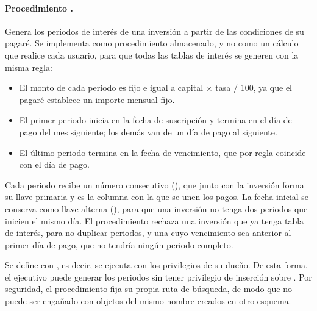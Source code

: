 \paragraph{Procedimiento .} Genera los periodos de interés de una inversión a partir de las condiciones de su pagaré. Se implementa como procedimiento almacenado, y no como un cálculo que realice cada usuario, para que todas las tablas de interés se generen con la misma regla:

\begin{itemize}[leftmargin=*]
	\item El monto de cada periodo es fijo e igual a capital $\times$ tasa / 100, ya que el pagaré establece un importe mensual fijo.
	\item El primer periodo inicia en la fecha de suscripción y termina en el día de pago del mes siguiente; los demás van de un día de pago al siguiente.
	\item El último periodo termina en la fecha de vencimiento, que por regla coincide con el día de pago.
\end{itemize}

Cada periodo recibe un número consecutivo (), que junto con la inversión forma su llave primaria y es la columna con la que se unen los pagos. La fecha inicial se conserva como llave alterna (), para que una inversión no tenga dos periodos que inicien el mismo día. El procedimiento rechaza una inversión que ya tenga tabla de interés, para no duplicar periodos, y una cuyo vencimiento sea anterior al primer día de pago, que no tendría ningún periodo completo.

Se define con , es decir, se ejecuta con los privilegios de su dueño. De esta forma, el ejecutivo puede generar los periodos sin tener privilegio de inserción sobre . Por seguridad, el procedimiento fija su propia ruta de búsqueda, de modo que no puede ser engañado con objetos del mismo nombre creados en otro esquema.

